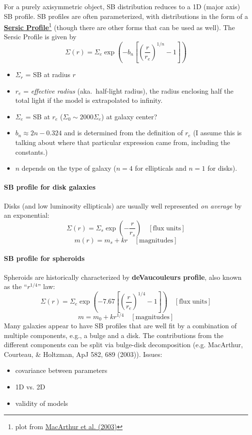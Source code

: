 \documentclass{article}
\newcommand{\mynotes}[1]{\textcolor{cadmiumgreen}{#1}}
\begin{document}
For a purely axisymmetric object, SB distribution reduces to a 1D
(major axis) SB profile.
SB profiles are often parameterized, with distributions in the form
of a
\href{http://astronomy.nmsu.edu/holtz/a555/html/diagrams/a616/sersic.htm}
{\textbf{Sersic Profile}}\footnote{plot from
\href{http://adsabs.harvard.edu/abs/2003ApJ...582..689M}
{MacArthur et al. (2003)}}
(though there are other forms that can be used as well).
The Sersic Profile is given by
\[
    \Sigma(r) = \Sigma_{e}\exp \left( -b_{n} \left[ \left(
    \frac{r}{r_{e}} \right) ^{1/n}-1 \right] \right)
    \]
\begin{itemize}
    \item $\Sigma_{r}$ = SB at radius $r$
    \item $r_{e}$ = \textit{effective radius} (aka.\ half-light radius),
        the radius enclosing half the
        total light if the model is extrapolated to infinity.
    \item $\Sigma_{e}$ = SB at $r_{e}$
        ($\Sigma_{0} \sim 2000\Sigma_{e}$) \mynotes{at galaxy center?}
    \item $b_{n} \approx 2n - 0.324$ and is determined from the definition of
        $r_{e}$ \mynotes{(I assume this is talking about where that particular
        expression came from, including the constants.)}
    \item $n$ depends on the type of galaxy ($n=4$ for ellipticals and $n=1$
        for disks).
\end{itemize}

\paragraph{SB profile for disk galaxies}
Disks (and low luminosity ellipticals) are usually well represented \emph{on
average} by an exponential:
\[
    \Sigma(r) = \Sigma_{s}\exp\left(-\frac{r}{r_{s}}\right)
    \quad\mathrm{[flux\;units]}
    \]
\[
    m(r) = m_{s} + kr
    \quad \mathrm{[magnitudes]}
    \]

\paragraph{SB profile for spheroids}
Spheroids are historically characterized by
\textbf{deVaucouleurs profile}, also known as the ``$r^{1/4}$'' law:
\[
    \Sigma(r) = \Sigma_e\exp\left(-7.67\left[\left(
    \frac{r}{r_e}\right)^{1/4}-1\right] \right)
    \quad\mathrm{[flux\;units]}
    \]
\[
    m = m_{0} + kr^{1/4}
    \quad\mathrm{[magnitudes]}
    \]
Many galaxies appear to have SB profiles that are well fit by a combination of multiple
components, e.g., a bulge and a disk.
The contributions from the different components can be split
via bulge-disk decomposition (e.g.
MacArthur, Courteau, \& Holtzman, ApJ 582, 689 (2003)). Issues:
\begin{itemize}
    \item covariance between parameters
    \item 1D vs. 2D
    \item validity of models
\end{itemize}
\end{document}
